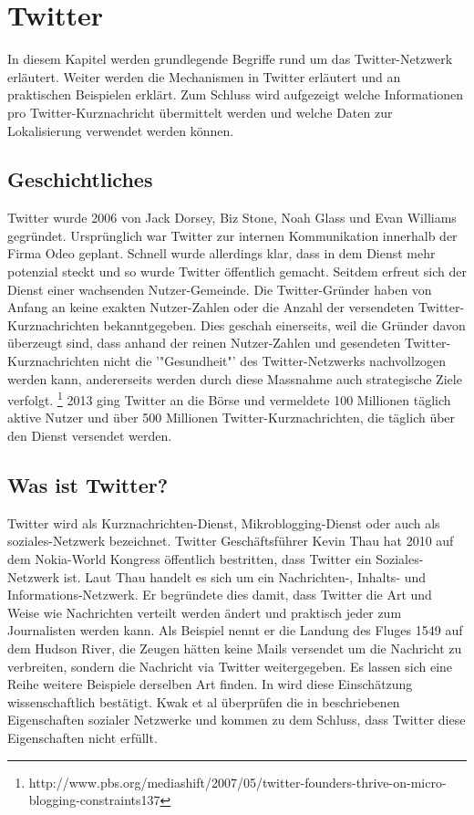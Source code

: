 	\section{Twitter} 
	In diesem Kapitel werden grundlegende Begriffe rund um das Twitter-Netzwerk erläutert. 
	Weiter werden die Mechanismen in Twitter erläutert und an praktischen Beispielen erklärt. 
	Zum Schluss wird aufgezeigt welche Informationen pro Twitter-Kurznachricht übermittelt werden und welche Daten zur Lokalisierung verwendet werden können.

	\subsection{Geschichtliches}
	Twitter wurde 2006 von Jack Dorsey, Biz Stone, Noah Glass und Evan Williams gegründet.
	Ursprünglich war Twitter zur internen Kommunikation innerhalb der Firma Odeo geplant.
	Schnell wurde allerdings klar, dass in dem Dienst mehr potenzial steckt und so wurde Twitter öffentlich gemacht.
	Seitdem erfreut sich der Dienst einer wachsenden Nutzer-Gemeinde.
	Die Twitter-Gründer haben von Anfang an keine exakten Nutzer-Zahlen oder die Anzahl der versendeten Twitter-Kurznachrichten bekanntgegeben.
	Dies geschah einerseits, weil die Gründer davon überzeugt sind, dass anhand der reinen Nutzer-Zahlen und gesendeten Twitter-Kurznachrichten nicht die '"Gesundheit"' des Twitter-Netzwerks nachvollzogen werden kann, andererseits werden durch diese Massnahme auch strategische Ziele verfolgt.  \footnote{http://www.pbs.org/mediashift/2007/05/twitter-founders-thrive-on-micro-blogging-constraints137}
	2013 ging Twitter an die Börse und vermeldete 100 Millionen täglich aktive Nutzer und über 500 Millionen Twitter-Kurznachrichten, die täglich über den Dienst versendet werden. 

	\subsection{Was ist Twitter?}
	Twitter wird als Kurznachrichten-Dienst, Mikroblogging-Dienst oder auch als soziales-Netzwerk bezeichnet. 
	Twitter Geschäftsführer Kevin Thau hat 2010 auf dem Nokia-World Kongress öffentlich bestritten, dass Twitter ein Soziales-Netzwerk ist. 
	Laut Thau handelt es sich um ein Nachrichten-, Inhalts- und Informations-Netzwerk. 
	Er begründete dies damit, dass Twitter die Art und Weise wie Nachrichten verteilt werden ändert und praktisch jeder zum Journalisten werden kann. 
	Als Beispiel nennt er die Landung des Fluges 1549 auf dem Hudson River, die Zeugen hätten keine Mails versendet um die Nachricht zu verbreiten, sondern die Nachricht via Twitter weitergegeben.
	Es lassen sich eine Reihe weitere Beispiele derselben Art finden. 
	In \cite{Kwak2010} wird diese Einschätzung wissenschaftlich bestätigt.
	Kwak et al überprüfen die in \cite{Newman2003} beschriebenen Eigenschaften sozialer Netzwerke und kommen zu dem Schluss, dass Twitter diese Eigenschaften nicht erfüllt.

